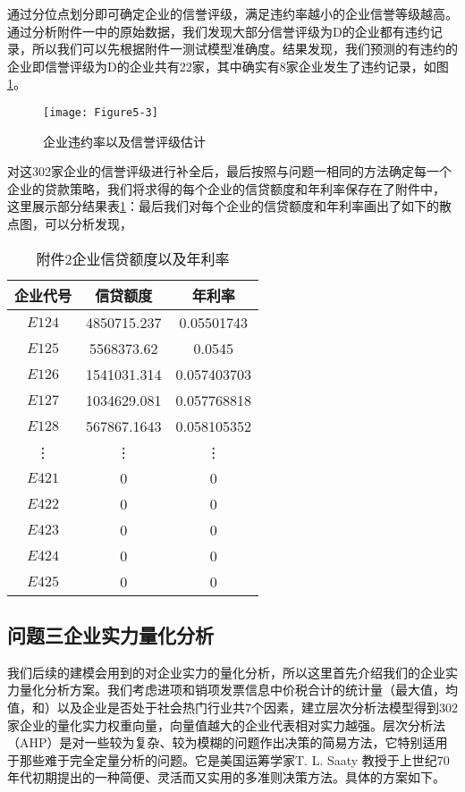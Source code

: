 \documentclass{cumcmthesis}
\begin{document}
通过分位点划分即可确定企业的信誉评级，满足违约率越小的企业信誉等级越高。通过分析附件一中的原始数据，我们发现大部分信誉评级为D的企业都有违约记录，所以我们可以先根据附件一测试模型准确度。结果发现，我们预测的有违约的企业即信誉评级为D的企业共有22家，其中确实有8家企业发生了违约记录，如图\ref{figpingji}。

\begin{figure}[H]
    \centering
    \texttt{[image: Figure5-3]}
    \caption{企业违约率以及信誉评级估计}
    \label{figpingji}
\end{figure}

对这302家企业的信誉评级进行补全后，最后按照与问题一相同的方法确定每一个企业的贷款策略，我们将求得的每个企业的信贷额度和年利率保存在了附件中，
这里展示部分结果表\ref{table23445}：最后我们对每个企业的信贷额度和年利率画出了如下的散点图，可以分析发现，

\begin{table}[H]
    \begin{center}
    \begin{tabular}{|c|c|c|}
        \hline
    企业代号 & 信贷额度 & 年利率\\
    \hline
    $E124$ & 4850715.237 & 0.05501743\\
    $E125$ & 5568373.62 & 0.0545\\
    $E126$ & 1541031.314 & 0.057403703\\
    $E127$ & 1034629.081 & 0.057768818\\
    $E128$ & 567867.1643 & 0.058105352\\
    \vdots & \vdots & \vdots\\
    $E421$ & 0 & 0\\
    $E422$ & 0 & 0\\
    $E423$ & 0 & 0\\
    $E424$ & 0 & 0\\
    $E425$ & 0 & 0\\
    \hline
    \end{tabular}
    \end{center}
    \caption{附件2企业信贷额度以及年利率}
    \label{table23445}
    \end{table}
\subsection{问题三企业实力量化分析}
我们后续的建模会用到的对企业实力的量化分析，所以这里首先介绍我们的企业实力量化分析方案。我们考虑进项和销项发票信息中价税合计的统计量（最大值，均值，和）以及企业是否处于社会热门行业共7个因素，建立层次分析法模型得到302家企业的量化实力权重向量，向量值越大的企业代表相对实力越强。层次分析法（AHP）是对一些较为复杂、较为模糊的问题作出决策的简易方法，它特别适用于那些难于完全定量分析的问题。它是美国运筹学家T. L. Saaty 教授于上世纪70 年代初期提出的一种简便、灵活而又实用的多准则决策方法。具体的方案如下。
\end{document}
